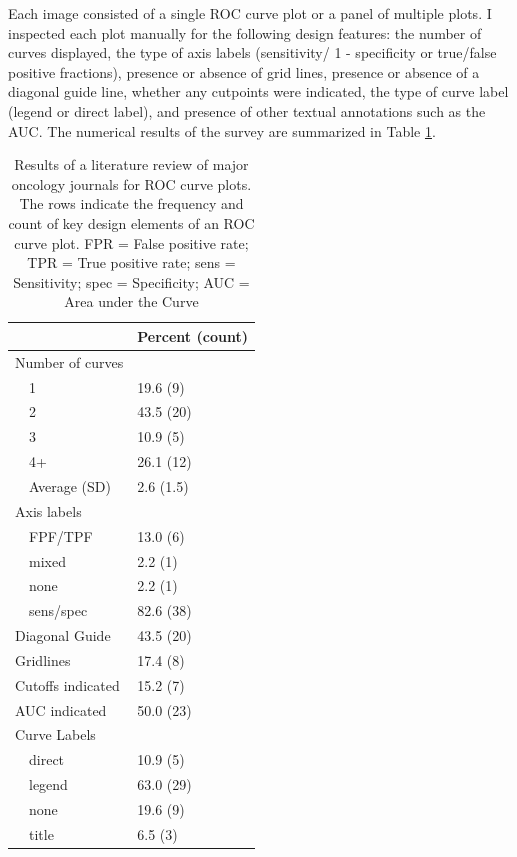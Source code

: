 \documentclass[codesnippet]{jss}
\begin{document}
Each image consisted of a single ROC curve plot or a panel of multiple
plots. I inspected each plot manually for the following design features:
the number of curves displayed, the type of axis labels (sensitivity/ 1
- specificity or true/false positive fractions), presence or absence of
grid lines, presence or absence of a diagonal guide line, whether any
cutpoints were indicated, the type of curve label (legend or direct
label), and presence of other textual annotations such as the AUC. The
numerical results of the survey are summarized in Table \ref{table1}.

\begin{table}[ht]
\centering
\begin{tabular}{ll}
  \hline
 & Percent (count) \\ 
  \hline
Number of curves &  \\ 
  $\quad$1 & 19.6 (9) \\ 
  $\quad$2 & 43.5 (20) \\ 
  $\quad$3 & 10.9 (5) \\ 
  $\quad$4+ & 26.1 (12) \\ 
  $\quad$Average (SD) & 2.6 (1.5) \\ 
  Axis labels &  \\ 
  $\quad$FPF/TPF & 13.0 (6) \\ 
  $\quad$mixed & 2.2 (1) \\ 
  $\quad$none & 2.2 (1) \\ 
  $\quad$sens/spec & 82.6 (38) \\ 
  Diagonal Guide & 43.5 (20) \\ 
  Gridlines & 17.4 (8) \\ 
  Cutoffs indicated & 15.2 (7) \\ 
  AUC indicated & 50.0 (23) \\ 
  Curve Labels &  \\ 
  $\quad$direct & 10.9 (5) \\ 
  $\quad$legend & 63.0 (29) \\ 
  $\quad$none & 19.6 (9) \\ 
  $\quad$title & 6.5 (3) \\ 
   \hline
\end{tabular}
\caption{Results of a literature review of major oncology journals for ROC curve plots. The rows indicate the frequency and count of key design elements of an ROC curve plot. FPR = False positive rate; TPR = True positive rate; sens = Sensitivity; spec = Specificity; AUC = Area under the Curve} 
\label{table1}
\end{table}
\end{document}
